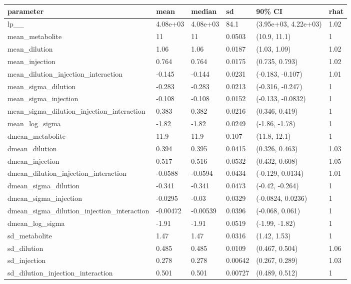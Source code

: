 
\begin{tabular}{l|l|l|l|l|l}
\hline
parameter & mean & median & sd & 90\% CI & rhat\\
\hline
lp\_\_ & 4.08e+03 & 4.08e+03 & 84.1 & (3.95e+03, 4.22e+03) & 1.02\\
\hline
mean\_metabolite & 11 & 11 & 0.0503 & (10.9, 11.1) & 1\\
\hline
mean\_dilution & 1.06 & 1.06 & 0.0187 & (1.03, 1.09) & 1.02\\
\hline
mean\_injection & 0.764 & 0.764 & 0.0175 & (0.735, 0.793) & 1.02\\
\hline
mean\_dilution\_injection\_interaction & -0.145 & -0.144 & 0.0231 & (-0.183, -0.107) & 1.01\\
\hline
mean\_sigma\_dilution & -0.283 & -0.283 & 0.0213 & (-0.316, -0.247) & 1\\
\hline
mean\_sigma\_injection & -0.108 & -0.108 & 0.0152 & (-0.133, -0.0832) & 1\\
\hline
mean\_sigma\_dilution\_injection\_interaction & 0.383 & 0.382 & 0.0216 & (0.346, 0.419) & 1\\
\hline
mean\_log\_sigma & -1.82 & -1.82 & 0.0249 & (-1.86, -1.78) & 1\\
\hline
dmean\_metabolite & 11.9 & 11.9 & 0.107 & (11.8, 12.1) & 1\\
\hline
dmean\_dilution & 0.394 & 0.395 & 0.0415 & (0.326, 0.463) & 1.03\\
\hline
dmean\_injection & 0.517 & 0.516 & 0.0532 & (0.432, 0.608) & 1.05\\
\hline
dmean\_dilution\_injection\_interaction & -0.0588 & -0.0594 & 0.0434 & (-0.129, 0.0134) & 1.01\\
\hline
dmean\_sigma\_dilution & -0.341 & -0.341 & 0.0473 & (-0.42, -0.264) & 1\\
\hline
dmean\_sigma\_injection & -0.0295 & -0.03 & 0.0329 & (-0.0824, 0.0236) & 1\\
\hline
dmean\_sigma\_dilution\_injection\_interaction & -0.00472 & -0.00539 & 0.0396 & (-0.068, 0.061) & 1\\
\hline
dmean\_log\_sigma & -1.91 & -1.91 & 0.0519 & (-1.99, -1.82) & 1\\
\hline
sd\_metabolite & 1.47 & 1.47 & 0.0316 & (1.42, 1.53) & 1\\
\hline
sd\_dilution & 0.485 & 0.485 & 0.0109 & (0.467, 0.504) & 1.06\\
\hline
sd\_injection & 0.278 & 0.278 & 0.00642 & (0.267, 0.289) & 1.03\\
\hline
sd\_dilution\_injection\_interaction & 0.501 & 0.501 & 0.00727 & (0.489, 0.512) & 1\\

\end{tabular}
